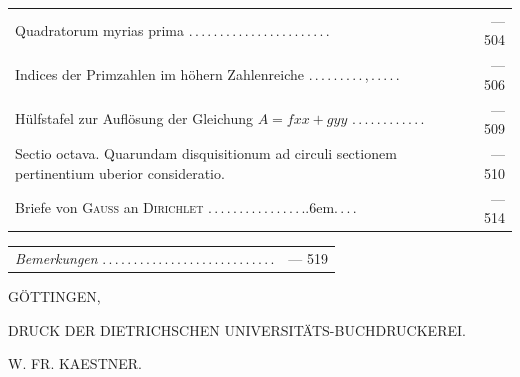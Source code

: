 \begin{longtable}{@{}p{.86\linewidth}@{\quad}r@{}}
Quadratorum myrias prima .\,.\,.\,.\,.\,.\,.\,.\,.\,.\,.\,.\,.\,.\,.\,.\,.\,.\,.\,.\,.\,.\,. & — 504 \\[3pt]
Indices der Primzahlen im höhern Zahlenreiche .\,.\,.\,.\,.\,.\,.\,.\,.\,,\,.\,.\,.\,.\,. & — 506 \\[3pt]
Hülfstafel zur Auflösung der Gleichung $A=fxx+gyy$ .\,.\,.\,.\,.\,.\,.\,.\,.\,.\,.\,. & — 509 \\[3pt]
Sectio octava. Quarundam disquisitionum ad circuli sectionem pertinentium uberior consideratio.  & — 510 \\[3pt]
Briefe von \textsc{Gauss} an \textsc{Dirichlet} .\,.\,.\,.\,.\,.\,.\,.\,.\,.\,.\,.\,.\,.\,.\,.\kern.6em.\,.\,.\,. & — 514 \\[3pt]
\end{longtable}\endgroup
\begingroup\fontsize{10}{13}\selectfont
\begin{longtable}{@{}p{.86\linewidth}@{\quad}r@{}}
\textit{Bemerkungen} .\,.\,.\,.\,.\,.\,.\,.\,.\,.\,.\,.\,.\,.\,.\,.\,.\,.\,.\,.\,.\,.\,.\,.\,.\,.\,.\,. & — 519 \\[3pt]
\end{longtable}\endgroup
{}
\begin{center}
GÖTTINGEN,\par\smallskip
DRUCK DER DIETRICHSCHEN UNIVERSITÄTS-BUCHDRUCKEREI.\par\smallskip
W. FR. KAESTNER.
\end{center}
